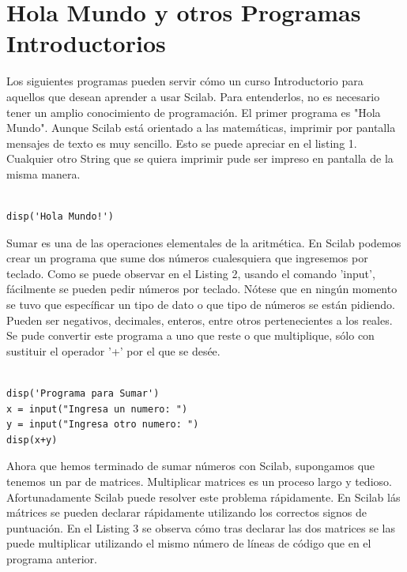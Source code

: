 \documentclass[11pt]{article} %
\begin{document}
\section{Hola Mundo y otros Programas Introductorios}

Los siguientes programas pueden servir cómo un curso Introductorio para aquellos que desean aprender a usar Scilab. Para entenderlos, no es necesario tener un amplio conocimiento de programación. El primer programa es "Hola Mundo". Aunque Scilab está orientado a las matemáticas, imprimir por pantalla mensajes de texto es muy sencillo. Esto se puede apreciar en el listing 1. Cualquier otro String que se quiera imprimir pude ser impreso en pantalla de la misma manera.
\lstset{language=Scilab}          %
\begin{lstlisting}[caption= Código escrito en Scilab para imprimir por pantalla "Hola Mundo!", label=amb, frame=single]  % Start your code-block

disp('Hola Mundo!')
\end{lstlisting}

Sumar es una de las operaciones elementales de la aritmética. En Scilab podemos crear un programa que sume dos números cualesquiera que ingresemos por teclado. Como se puede observar en el Listing 2, usando el comando 'input', fácilmente se pueden pedir números por teclado. Nótese que en ningún momento se tuvo que específicar un tipo de dato o que tipo de números se están pidiendo. Pueden ser negativos, decimales, enteros, entre otros pertenecientes a los reales. Se pude convertir este programa a uno que reste o que multiplique, sólo con sustituir el operador '+' por el que se desée.

\begin{lstlisting}[caption= Código escrito en Scilab para sumar dos números ingresados por teclado, label=amb, frame=single]  % Start your code-block

disp('Programa para Sumar')
x = input("Ingresa un numero: ")
y = input("Ingresa otro numero: ")
disp(x+y)
\end{lstlisting}

Ahora que hemos terminado de sumar números con Scilab, supongamos que tenemos un par de matrices. Multiplicar matrices es un proceso largo y tedioso. Afortunadamente Scilab puede resolver este problema rápidamente. En Scilab lás mátrices se pueden declarar rápidamente utilizando los correctos signos de puntuación. En el Listing 3 se observa cómo tras declarar las dos  matrices se las puede multiplicar utilizando el mismo número de líneas de código que en el programa anterior.
\end{document}
